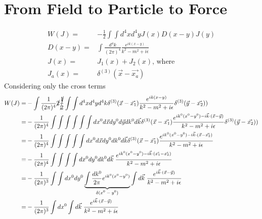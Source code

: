 \documentclass[]{article}
\begin{document}
\section{From Field to Particle to Force}
\begin{align*}
	W(J) =& - \frac{1}{2} \int \int d^4x d^4y J(x) D(x-y) J(y)\\
	D(x-y) =& \int \frac{d^4k}{(2\pi)^4} \frac{e^{ik(x-y)}}{k^2-m^2+i\epsilon}\\
	J(x) =& J_1(x) + J_2(x) \text{, where}\\
	J_{a}(x) =&\delta^{(3)}(\vec{x}-\vec{x_a}) 
\end{align*}
Considering only the cross terms
\begin{align*}
	W(J) =& - \int \frac{1}{(2\pi)^4} \cancel{2} \cancel{\frac{1}{2}} \int \int d^4x d^4y d^4k \delta^{(3)}(\vec{x}-\vec{x_1})   \frac{e^{ik(x-y)}}{k^2-m^2+i\epsilon} \delta^{(3)}(\vec{y}-\vec{x_2}))\\
	=& - \frac{1}{(2\pi)^4} \int \int \int \int \int \int dx^0 d\vec{x} dy^0 d\vec{y} dk^0 d\vec{k}  \delta^{(3)}(\vec{x}-\vec{x_1})   \frac{e^{ik^0(x^0-y^0)-i\vec{k} \cdot (\vec{x}-\vec{y})}}{k^2-m^2+i\epsilon} \delta^{(3)}(\vec{y}-\vec{x_2}))\\
	=& - \frac{1}{(2\pi)^4} \int \int \int \int \int dx^0 d\vec{x} dy^0 dk^0 d\vec{k}  \delta^{(3)}(\vec{x}-\vec{x_1})   \frac{e^{ik^0(x^0-y^0)-i\vec{k} \cdot (\vec{x}-\vec{x_2})}}{k^2-m^2+i\epsilon} \\
	=& - \frac{1}{(2\pi)^4} \int \int \int \int dx^0  dy^0 dk^0 d\vec{k} \;    \frac{e^{ik^0(x^0-y^0)-i\vec{k} \cdot (\vec{x_1}-\vec{x_2})}}{k^2-m^2+i\epsilon}\\
	=& - \frac{1}{(2\pi)^3} \int \int dx^0  dy^0 \underbrace{\int \frac{dk^0}{2\pi} e^{ik^0(x^0-y^0)}}_\text{$\delta(x^0-y^0)$} \int d\vec{k} \; \frac{e^{i\vec{k} \cdot (\vec{x}-\vec{y})}}{k^2-m^2+i\epsilon}\\
	=& - \frac{1}{(2\pi)^3} \int  dx^0  \int d\vec{k} \; \frac{e^{i\vec{k} \cdot (\vec{x}-\vec{y})}}{k^2-m^2+i\epsilon}
\end{align*}
\end{document}
